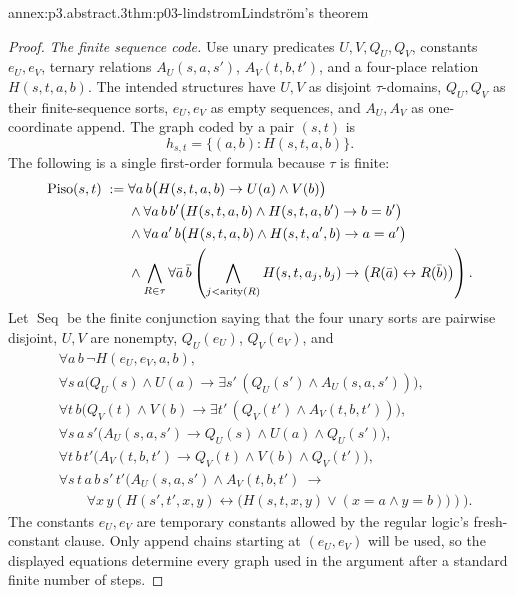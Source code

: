 \begin{annexitem}{annex:p3.abstract.3}{thm:p03-lindstrom}{Lindstr\"om's theorem}
\begin{proof}
\emph{The finite sequence code.}
Use unary predicates \(U,V,Q_U,Q_V\), constants \(e_U,e_V\), ternary
relations \(A_U(s,a,s')\), \(A_V(t,b,t')\), and a four-place relation
\(H(s,t,a,b)\).  The intended structures have \(U,V\) as disjoint
\(\tau\)-domains, \(Q_U,Q_V\) as their finite-sequence sorts, \(e_U,e_V\) as
empty sequences, and \(A_U,A_V\) as one-coordinate append.  The graph coded
by a pair \((s,t)\) is
\[
 h_{s,t}=\{(a,b):H(s,t,a,b)\}.
\]
The following is a single first-order formula because \(\tau\) is finite:
\[
\begin{aligned}
 \operatorname{Piso}(s,t)\;\mathrel{:=}{}&
  \forall a\,b\bigl(H(s,t,a,b)\to U(a)\land V(b)\bigr)\\
 &\land\forall a\,b\,b'
   \bigl(H(s,t,a,b)\land H(s,t,a,b')\to b=b'\bigr)\\
 &\land\forall a\,a'\,b
   \bigl(H(s,t,a,b)\land H(s,t,a',b)\to a=a'\bigr)\\
 &\land\bigwedge_{R\in\tau}\forall\bar a\,\bar b
   \left(\bigwedge_{j<\operatorname{arity}(R)}H(s,t,a_j,b_j)
     \to\bigl(R(\bar a)\leftrightarrow R(\bar b)\bigr)\right).
\end{aligned}
\]
Let \(\operatorname{Seq}\) be the finite conjunction saying that the four
unary sorts are pairwise disjoint, \(U,V\) are nonempty,
\(Q_U(e_U)\), \(Q_V(e_V)\), and
\[
\begin{aligned}
 &\forall a\,b\,\neg H(e_U,e_V,a,b),\\
 &\forall s\,a\bigl(Q_U(s)\land U(a)\to
      \exists s'\,(Q_U(s')\land A_U(s,a,s'))\bigr),\\
 &\forall t\,b\bigl(Q_V(t)\land V(b)\to
      \exists t'\,(Q_V(t')\land A_V(t,b,t'))\bigr),\\
 &\forall s\,a\,s'\bigl(A_U(s,a,s')\to
      Q_U(s)\land U(a)\land Q_U(s')\bigr),\\
 &\forall t\,b\,t'\bigl(A_V(t,b,t')\to
      Q_V(t)\land V(b)\land Q_V(t')\bigr),\\
 &\forall s\,t\,a\,b\,s'\,t'\bigl(
 A_U(s,a,s')\land A_V(t,b,t')\ \to{}\\[-2mm]
 &\qquad\forall x\,y\left(
 H(s',t',x,y)\leftrightarrow
   \bigl(H(s,t,x,y)\lor(x=a\land y=b)\bigr)\right)\bigr).
\end{aligned}
\]
The constants \(e_U,e_V\) are temporary constants allowed by the regular
logic's fresh-constant clause.  Only append chains starting at
\((e_U,e_V)\) will be used, so the displayed equations determine every graph
used in the argument after a standard finite number of steps.


\end{proof}
\end{annexitem}
